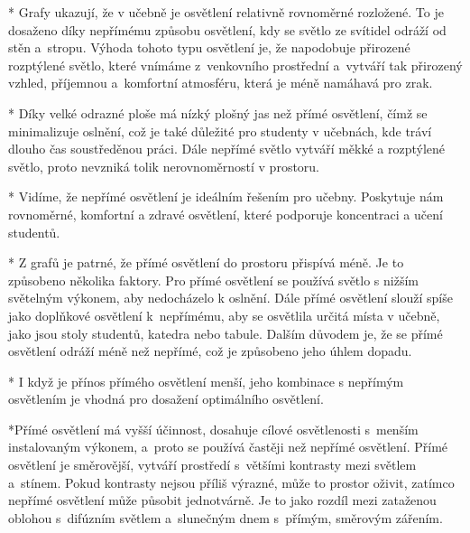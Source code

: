 \begitems
    * Grafy ukazují, že v učebně je osvětlení relativně rovnoměrné rozložené.
    To je dosaženo díky nepřímému způsobu osvětlení, kdy se světlo ze svítidel odráží od stěn a~stropu.
    Výhoda tohoto typu osvětlení je, že napodobuje přirozené rozptýlené světlo, které vnímáme z~venkovního prostřední
    a~vytváří tak přirozený vzhled, příjemnou a~komfortní atmosféru, která je méně namáhavá pro zrak.

    * Díky velké odrazné ploše má nízký plošný jas než přímé osvětlení, čímž se minimalizuje oslnění, což je také důležité pro
    studenty v učebnách, kde tráví dlouho čas soustředěnou práci.
    Dále nepřímé světlo vytváří měkké a rozptýlené světlo, proto nevzniká tolik nerovnoměrností v prostoru.

    * Vidíme, že nepřímé osvětlení je ideálním řešením pro učebny. Poskytuje nám rovnoměrné,
    komfortní a zdravé osvětlení, které podporuje koncentraci a učení studentů.
\enditems

\medskip {}
\begitems
  *  Z grafů je patrné, že přímé osvětlení do prostoru přispívá méně. Je to způsobeno několika faktory.
    Pro přímé osvětlení se používá světlo s nižším světelným výkonem, aby nedocházelo k oslnění.
    Dále přímé osvětlení slouží spíše jako doplňkové osvětlení k~nepřímému, aby se osvětlila určitá místa v učebně,
    jako jsou stoly studentů, katedra nebo tabule. Dalším důvodem je, že se přímé osvětlení odráží
    méně než nepřímé, což je způsobeno jeho úhlem dopadu.

  *  I když je přínos přímého osvětlení menší, jeho kombinace s nepřímým osvětlením je vhodná pro dosažení
    optimálního osvětlení.


  *Přímé osvětlení má vyšší účinnost, dosahuje cílové osvětlenosti s~menším instalovaným výkonem, a~proto se používá častěji než
  nepřímé osvětlení. Přímé osvětlení je směrovější, vytváří prostředí s~většími kontrasty mezi světlem a~stínem. Pokud kontrasty
  nejsou příliš výrazné, může to prostor oživit, zatímco nepřímé osvětlení může působit jednotvárně. Je to jako rozdíl mezi
  zataženou oblohou s~difúzním světlem a~slunečným dnem s~přímým, směrovým zářením.

